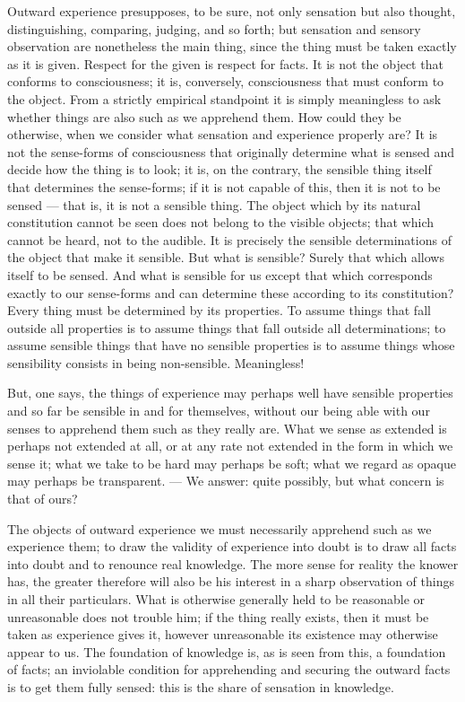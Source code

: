 \documentclass[12pt]{book}
\begin{document}
Outward experience presupposes, to be sure, not only sensation but also
thought, distinguishing, comparing, judging, and so forth; but sensation and
sensory observation are nonetheless the main thing, since the thing must be
taken exactly as it is given. Respect for the given is respect for facts. It
is not the object that conforms to consciousness; it is, conversely,
consciousness that must conform to the object. From a strictly empirical
standpoint it is simply meaningless to ask whether things are also such as we
apprehend them. How could they be otherwise, when we consider what sensation
and experience properly are? It is not the sense-forms of consciousness that
originally determine what is sensed and decide how the thing is to look; it
is, on the contrary, the sensible thing itself that determines the
sense-forms; if it is not capable of this, then it is not to be sensed --- that
is, it is not a sensible thing. The object which by its natural constitution
cannot be seen does not belong to the visible objects; that which cannot be
heard, not to the audible. It is precisely the sensible determinations of the
object that make it sensible. But what is sensible? Surely that which allows
itself to be sensed. And what is sensible for us except that which corresponds
exactly to our sense-forms and can determine these according to its
constitution? Every thing must be determined by its properties. To assume
things that fall outside all properties is to assume things that fall outside
all determinations; to assume sensible things that have no sensible properties
is to assume things whose sensibility consists in being non-sensible.
Meaningless!

But, one says, the things of experience may perhaps well have sensible
properties and so far be sensible in and for themselves, without our being
able with our senses to apprehend them such as they really are. What we sense
as extended is perhaps not extended at all, or at any rate not extended in the
form in which we sense it; what we take to be hard may perhaps be soft; what
we regard as opaque may perhaps be transparent. --- We answer: quite possibly,
but what concern is that of ours?

The objects of outward experience we must necessarily apprehend such as we
experience them; to draw the validity of experience into doubt is to draw all
facts into doubt and to renounce real knowledge. The more sense for reality
the knower has, the greater therefore will also be his interest in a sharp
observation of things in all their particulars. What is otherwise generally
held to be reasonable or unreasonable does not trouble him; if the thing
really exists, then it must be taken as experience gives it, however
unreasonable its existence may otherwise appear to us. The foundation of
knowledge is, as is seen from this, a foundation of facts; an inviolable
condition for apprehending and securing the outward facts is to get them
fully sensed: this is the share of sensation in knowledge.
\end{document}
